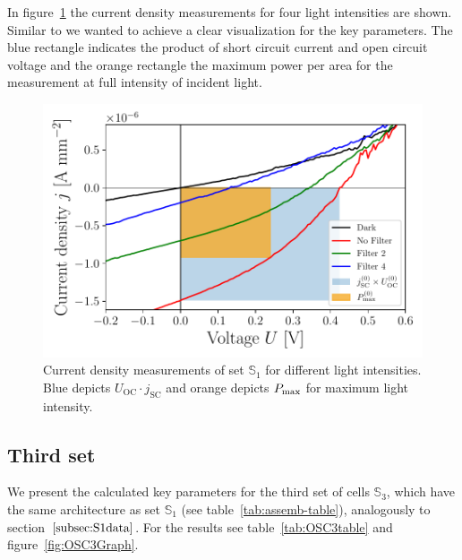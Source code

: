 In figure~\ref{fig:OSC1Graph} the current density measurements for four light intensities are shown. Similar to \cite{source1} we wanted to achieve a clear visualization for the key parameters. The blue rectangle indicates the product of short circuit current and open circuit voltage and the orange rectangle the maximum power per area for the measurement at full intensity of incident light.

\begin{figure}[ht]\centering
\includegraphics[width=\columnwidth]{../../../IV-Curve-Analysis/OSC1Graph.pdf}
\caption{Current density measurements of set $\mathbb{S}_1$ for different light intensities. Blue depicts $U_{\mathrm{OC}}\!\cdot\!j_{\mathrm{SC}}$ and orange depicts $P_{\text{max}}$ for maximum light intensity.}
\label{fig:OSC1Graph}
\end{figure}

\subsection{Third set}

We present the calculated key parameters for the third set of cells $\mathbb{S}_3$, which have the same architecture as set $\mathbb{S}_1$ (see table~\ref{tab:assemb-table}), analogously to section~$\ref{subsec:S1data}$. For the results see table~\ref{tab:OSC3table} and figure~\ref{fig:OSC3Graph}.

